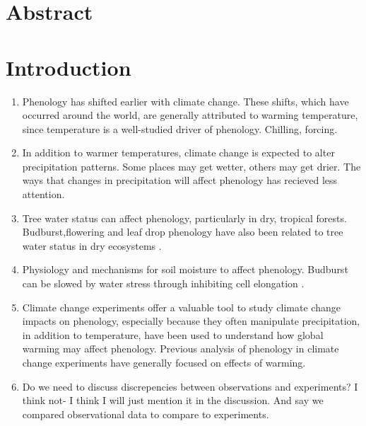 \documentclass{article}
\begin{document}
\begin{singlespace}
\end{singlespace}


\clearpage
\section*{Abstract}

\section* {Introduction}
\begin{singlespace}
\begin{enumerate}
\item Phenology has shifted earlier with climate change. These shifts, which have occurred around the world, are generally attributed to warming temperature, since temperature is a well-studied driver of phenology.  Chilling, forcing. 
\item In addition to warmer temperatures, climate change is expected to alter precipitation patterns. Some places may get wetter, others may get drier. The ways that changes in precipitation will affect phenology has recieved less attention. 
\item Tree water status can affect phenology, particularly in dry, tropical forests. Budburst,flowering and leaf drop phenology have also been related to tree water status in dry ecosystems \citep{essiamah1986,reich1984, van1993}. 
\item Physiology and mechanisms for soil moisture to affect phenology. Budburst can be slowed by water stress through inhibiting cell elongation \citep{essiamah1986}.
\item Climate change experiments offer a valuable tool to study climate change impacts on phenology, especially because they often manipulate precipitation, in addition to temperature, have been used to understand how global warming may affect phenology. Previous analysis of phenology in climate change experiments have generally focused on effects of warming. 
\item Do we need to discuss discrepencies between observations and experiments? I think not- I think I will just mention it in the discussion. And say we compared observational data to compare to experiments. 


\end{enumerate}
\end{singlespace}
\end{document}
